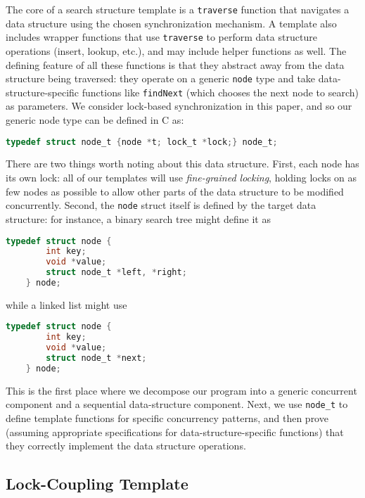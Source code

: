 \documentclass[sigplan,10pt, screen]{acmart}
\begin{document}
The core of a search structure template is a \lstinline{traverse} function that navigates a data structure using the chosen synchronization mechanism. A template also includes wrapper functions that use \lstinline{traverse} to perform data structure operations (insert, lookup, etc.), and may include helper functions as well. The defining feature of all these functions is that they abstract away from the data structure being traversed: they operate on a generic \lstinline{node} type and take data-structure-specific functions like \lstinline{findNext} (which chooses the next node to search) as parameters. We consider lock-based synchronization in this paper, and so our generic node type can be defined in C as:
\begin{lstlisting}[language = C, backgroundcolor=\color{white}, basicstyle=\ttfamily\footnotesize, xleftmargin=-2.07em]
	typedef struct node_t {node *t; lock_t *lock;} node_t;
\end{lstlisting}
There are two things worth noting about this data structure. First, each node has its own lock: all of our templates will use \emph{fine-grained locking}, holding locks on as few nodes as possible to allow other parts of the data structure to be modified concurrently. Second, the \lstinline{node} struct itself is defined by the target data structure: for instance, a binary search tree might define it as 
\begin{lstlisting}[language = C, backgroundcolor=\color{white}, basicstyle=\ttfamily\footnotesize, xleftmargin=-2.07em]
	typedef struct node {
		int key; 
		void *value; 
		struct node_t *left, *right;
	} node;
\end{lstlisting}
while a linked list might use
\begin{lstlisting}[language = C, backgroundcolor=\color{white}, basicstyle=\ttfamily\footnotesize, xleftmargin=-2.07em]
	typedef struct node {
		int key; 
		void *value; 
		struct node_t *next;
	} node;
\end{lstlisting}
This is the first place where we decompose our program into a generic concurrent component and a sequential data-structure component. Next, we use \lstinline{node_t} to define template functions for specific concurrency patterns, and then prove (assuming appropriate specifications for data-structure-specific functions) that they correctly implement the data structure operations.

\subsection{Lock-Coupling Template}
\label{lock-coupling-algo}
\end{document}
